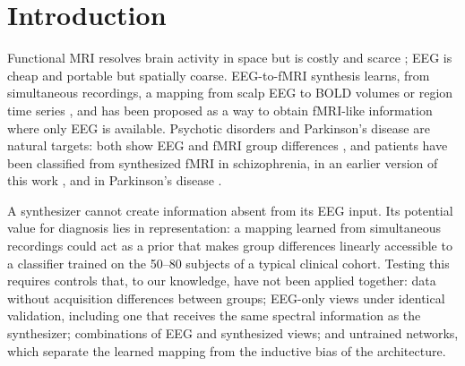\documentclass[pdflatex,referee,sn-basic]{sn-jnl}%
\begin{document}

\maketitle

\section{Introduction}\label{section:introduction}

Functional MRI resolves brain activity in space but is costly and scarce \cite{ogbole2018survey}; EEG is cheap and portable but spatially coarse. EEG-to-fMRI synthesis learns, from simultaneous recordings, a mapping from scalp EEG to BOLD volumes or region time series \cite{liu2019convolutional, liu2020latent, bricman2021eeg2fmri, calhas2022eeg, roos2025brainwaves, he2025spec2vol, lanzino2024ntvit, yao2025catd, li2024neurobolt, li2026unebolt}, and has been proposed as a way to obtain fMRI-like information where only EEG is available. Psychotic disorders and Parkinson's disease are natural targets: both show EEG and fMRI group differences \cite{tan2016eeg, roach2008event, bates2009low, oh2020identifying, velakoulis2006hippocampal, haukvik2013schizophrenia}, and patients have been classified from synthesized fMRI in schizophrenia, in an earlier version of this work \cite{calhas2023medrxiv}, and in Parkinson's disease \cite{yao2025catd}.

A synthesizer cannot create information absent from its EEG input. Its potential value for diagnosis lies in representation: a mapping learned from simultaneous recordings could act as a prior that makes group differences linearly accessible to a classifier trained on the 50--80 subjects of a typical clinical cohort. Testing this requires controls that, to our knowledge, have not been applied together: data without acquisition differences between groups; EEG-only views under identical validation, including one that receives the same spectral information as the synthesizer; combinations of EEG and synthesized views; and untrained networks, which separate the learned mapping from the inductive bias of the architecture.
\end{document}
